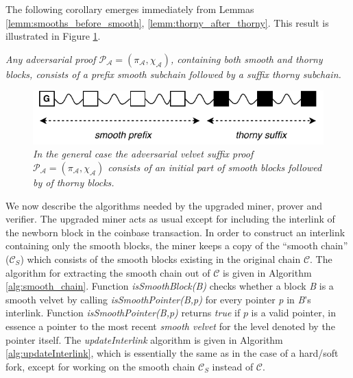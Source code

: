 The following corollary emerges immediately from Lemmas \ref{lemm:smooths_before_smooth}, \ref{lemm:thorny_after_thorny}. This result is illustrated in Figure \ref{fig:adversarial_velvet_proof}.

\begin{corollary}
	\textit{Any adversarial proof $\mathcal{P_A} = (\pi_\mathcal{A}, \chi_\mathcal{A})$, containing both smooth and thorny blocks, consists of a prefix smooth subchain followed by a suffix thorny subchain.}
	\label{cor:adversarial_proof_scheme}
\end{corollary}

\begin{figure}[h!]
	\begin{center}
		\includegraphics[scale=0.75]{figures/adversarial_velvet_proof.pdf}
	\end{center}
	\caption{\textit{In the general case the adversarial velvet suffix proof $\mathcal{P_A} = (\pi_\mathcal{A}, \chi_\mathcal{A})$ consists of an initial part of smooth blocks followed by  of thorny blocks.}}
	\label{fig:adversarial_velvet_proof}
\end{figure}

We now describe the algorithms needed by the upgraded miner, prover and verifier. The upgraded miner acts as usual except for including the interlink of the newborn block in the coinbase transaction. In order to construct an interlink containing only the smooth blocks, the miner keeps a copy of the ``smooth chain'' ($\mathcal{C}_S$) which consists of the smooth blocks existing in the original chain $\mathcal{C}$. The algorithm for extracting the smooth chain out of $\mathcal{C}$ is given in Algorithm \ref{alg:smooth_chain}. Function \textit{isSmoothBlock(B)} checks whether a
block \textit{B} is a smooth velvet by calling \textit{isSmoothPointer(B,p)}
for every pointer \textit{p} in \textit{B}'s interlink. Function
\textit{isSmoothPointer(B,p)} returns \emph{true} if $p$ is a valid 
pointer, in essence a pointer to the most recent \emph{smooth velvet}
for the level denoted by the pointer itself. The \textit{updateInterlink} algorithm is given in Algorithm \ref{alg:updateInterlink}, which is essentially the same as in the case of a hard/soft fork, except for working on the smooth chain $\mathcal{C}_S$ instead of $\mathcal{C}$.


